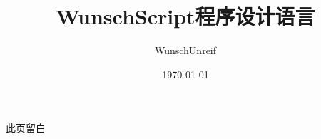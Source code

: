 \documentclass[lang=cn, device=pad, color=blue, 12pt]{elegantbook}
\author{
    WunschUnreif
}
\date{\today}
\institute{WunschUnreif}
\title{WunschScript程序设计语言}
\subtitle{\text{}}
\begin{document}
    \maketitle
    
    \newpage
    \begin{center}
        此页留白
    \end{center}
    \newpage

    \frontmatter

    
\end{document}
